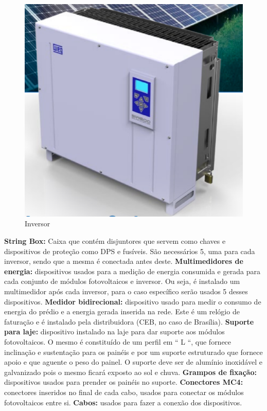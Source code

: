 \begin{figure}[!ht]
  \centering
  \includegraphics[keepaspectratio=true,scale=0.4]{figuras/inversor.eps}
  \caption{Inversor}
  \label{fig:inversor}
\end{figure}

\textbf{String Box:} Caixa que contém disjuntores que servem como chaves e dispositivos de proteção como DPS e fusíveis. São necessários 5, uma para cada inversor, sendo que a mesma é conectada antes deste.
\textbf{Multimedidores de energia:} dispositivos usados para a medição de energia consumida e gerada para cada conjunto de módulos fotovoltaicos e inversor. Ou seja, é instalado um multimedidor após cada inversor, para o caso específico serão usados 5 desses dispositivos.
\textbf{Medidor bidirecional:} dispositivo usado para medir o consumo de energia do prédio e a energia gerada inserida na rede. Este é um relógio de faturação e é instalado pela distribuidora (CEB, no caso de Brasília).
\textbf{Suporte para laje:} dispositivo instalado na laje para dar suporte aos módulos fotovoltaicos. O mesmo é constituído de um perfil em “ L “, que fornece inclinação e sustentação para os painéis e por um suporte estruturado que fornece apoio e que aguente o peso do painel. O suporte deve ser de alumínio inoxidável e galvanizado pois o mesmo ficará exposto ao sol e chuva. 
\textbf{Grampos de fixação:} dispositivos usados para prender os painéis no suporte.
\textbf{Conectores MC4:} conectores inseridos no final de cada cabo, usados para conectar os módulos fotovoltaicos entre si.
\textbf{Cabos:} usados para fazer a conexão dos dispositivos.

